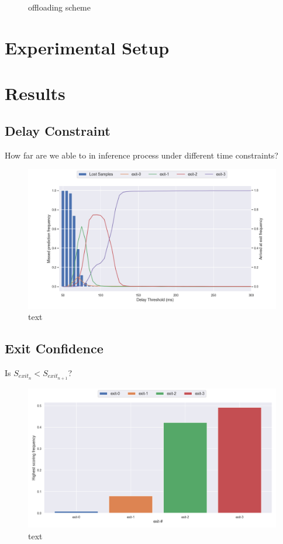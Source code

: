 \begin{figure}
	\caption[Offloading scheme]{offloading scheme}
	\label{fig:offloading-scheme}
\end{figure} 

\section{Experimental Setup}

\section{Results}

\subsection{Delay Constraint}

How far are we able to in inference process under different time constraints? 

\begin{figure}
	\centering
	\includegraphics[width=\linewidth]{figures/edge/exit-reached.png}
	\caption[short text]{text}
	\label{fig:exit-reached}
\end{figure}

\subsection{Exit Confidence}

Is $S_{exit_{n}} < S_{exit_{n+1}}$?


\begin{figure}
	\centering
	\includegraphics[width=\linewidth]{figures/edge/highest-scoring.png}
	\caption[short text]{text}
	\label{fig:exit-highscore}
\end{figure}

